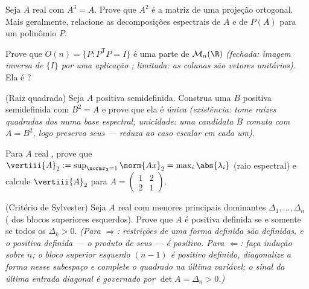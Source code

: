 \begin{exercise}[$\star\star$]\label{exo:b2:quadratic:4}
Seja $A$ real  com $A^3 = A$. Prove que $A^2$ é a
matriz de uma projeção ortogonal. Mais geralmente, relacione as
decomposições espectrais de $A$ e de $P(A)$ para um polinômio $P$.
\end{exercise}

\begin{exercise}[$\star\star$]\label{exo:b2:quadratic:5}
Prove que $O(n) = \{P : P^{\mathsf T}P = I\}$ é uma parte 
de $\mathcal{M}_n(\R)$ \emph{(fechada: imagem inversa de $\{I\}$ por uma
aplicação ; limitada: as colunas são vetores unitários)}. Ela é
?
\end{exercise}

\begin{exercise}[$\star\star$]\label{exo:b2:quadratic:6}
(Raiz quadrada) Seja $A$  positiva semidefinida. Construa
uma $B$  positiva semidefinida com $B^2 = A$ e prove
que ela é \emph{única} \emph{(existência: tome raízes quadradas dos
 numa base espectral; unicidade: uma candidata $B$
comuta com $A = B^2$, logo preserva seus  --- reduza ao
caso escalar em cada um)}.
\end{exercise}

\begin{exercise}[$\star\star$]\label{exo:b2:quadratic:7}
Para $A$ real , prove que $\vertiii{A}_2 :=
\sup_{\norm x_2 = 1}\norm{Ax}_2 = \max_i \abs{\lambda_i}$
(raio espectral) e calcule $\vertiii{A}_2$ para $A =
\begin{pmatrix} 1 & 2\\ 2 & 1\end{pmatrix}$.
\end{exercise}

\begin{exercise}[$\star\star\star$]\label{exo:b2:quadratic:8}
(Critério de Sylvester) Seja $A$ real  com menores
principais dominantes $\Delta_1, \dots, \Delta_n$ ( dos
blocos superiores esquerdos). Prove que $A$ é positiva definida se e somente
se todos os $\Delta_k > 0$. \emph{(Para $\Rightarrow$: restrições de uma
forma definida são definidas, e o  positiva
definida --- o produto de seus  --- é positivo.
Para $\Leftarrow$: faça indução sobre $n$; o bloco superior esquerdo $(n-1)$ é
positivo definido, diagonalize a forma nesse subespaço e
complete o quadrado na última variável; o sinal da última
entrada diagonal é governado por $\det A = \Delta_n > 0$.)}
\end{exercise}

